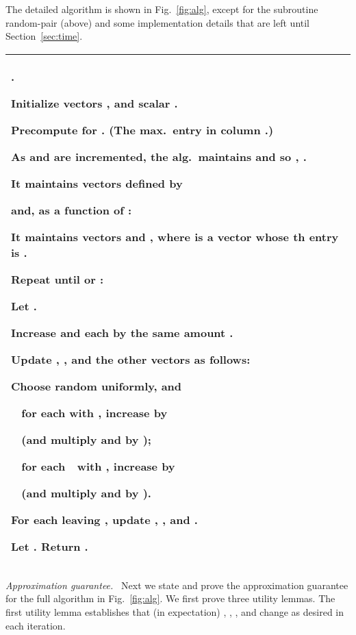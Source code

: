 \documentclass[11pt]{svjour3} \usepackage{fullpage}
\makeatletter
\renewcommand{\paragraph}[1]{\smallskip\vspace{2pt}\par{\em #1}~}
\newcommand{\algfont}{}
\newcommand{\tab}{\hspace*{0.13in}}
\newcounter{myline}
\newenvironment{alg}{
  \medskip
  \par
  \algfont
  \centering
    \begin{tabular}{|@{}|l|}\hline
      \begin{minipage}{0.96\linewidth}\raggedright
          \smallskip
          \begin{list}{\arabic{myline}.}{
            \usecounter{myline}
            \setlength{\listparindent}{0in}
            \setlength{\topsep}{0in}
            \setlength{\itemsep}{.013in}
            \setlength{\parsep}{.013in}
            \setlength{\rightmargin}{0in}
            \setlength{\itemindent}{0in}
\setlength{\labelsep}{0.065in}
            \setlength{\leftmargin}{0.2in}
}
          }{
        \end{list}
        \smallskip
      \end{minipage}\\\hline
    \end{tabular}
    \par
    \noindent
}
\newcommand{\A}{\item}
\newcommand{\Ahead}[1]{\item[]\hspace*{-\leftmargin}{\textrm{#1}}}
\newcommand{\algbeg}{\addtolength{\labelsep}{0.13in}
  \addtolength{\itemindent}{0.13in}
  \addtolength{\listparindent}{0.13in}
}
\newcommand{\algend}{\addtolength{\labelsep}{-0.13in}
  \addtolength{\itemindent}{-0.13in}
  \addtolength{\listparindent}{-0.13in}
}
\makeatother
\begin{document}
\smallskip
The detailed algorithm is shown in Fig.~\ref{fig:alg}, except for
the subroutine {\algfont random-pair} (above)
and some implementation details that are left until Section~\ref{sec:time}.  
\begin{figure*}[t]
\begin{alg}
\Ahead{{\bf solve} 
--- {\em return a -approximate primal-dual pair w/ high prob.}
}

\A {Initialize} vectors , 
and scalar .

\A Precompute  for .
(The max.~entry in column .)

As  and  are incremented,
the alg.~maintains  and  
so , .

It maintains vectors  defined by
 
and, as a function of :

It maintains vectors  and ,
where  is a vector whose th entry is .

\A {Repeat} until  or :

\algbeg
\A Let .
\label{line:sample}

\A {Increase}  and  each 
by the same amount .
\label{line:incx}

\A Update , , and the other vectors as follows:  

\A \tab Choose random  uniformly, and 

\A \tab~ for each  with , 
{increase}  by 
\label{line:incyp}
\A \tab~ \hfill (and multiply  and  by );

\A \tab~ for each\, \, with ,
{increase}  by 
\label{line:incyd}
\A \tab~ \hfill (and multiply  and  by ).

\A For each  leaving , update , , and .

\algend

\A Let .
{Return} .
\end{alg}

\caption{The full algorithm.
 denotes .
Implementation details are in Section~\ref{sec:implementation}.
}
\label{fig:alg}
\end{figure*}


\paragraph{Approximation guarantee.} \label{sec:correctness}
Next we state and prove the approximation guarantee for the full algorithm
in Fig.~\ref{fig:alg}.   We first prove three utility lemmas.
The first utility lemma establishes that (in expectation)
, , , and  change 
as desired in each iteration.
\newpage
\end{document}
